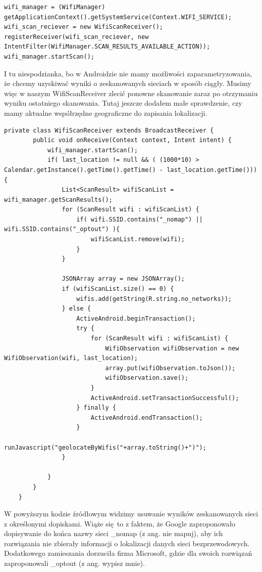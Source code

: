 \begin{verbatim}
wifi_manager = (WifiManager) getApplicationContext().getSystemService(Context.WIFI_SERVICE);
wifi_scan_reciever = new WifiScanReceiver();
registerReceiver(wifi_scan_reciever, new IntentFilter(WifiManager.SCAN_RESULTS_AVAILABLE_ACTION));
wifi_manager.startScan();
\end{verbatim}

I tu niespodzianka, bo w Androidzie nie mamy możliwości zaparametryzowania, że chcemy uzyskiwać wyniki o zeskanowanych sieciach w sposób ciągły. Musimy więc w naszym WifiScanReceiver zlecić ponowne skanowanie zaraz po otrzymaniu wyniku ostatniego skanowania. Tutaj jeszcze dodałem małe sprawdzenie, czy mamy aktualne współrzędne geograficzne do zapisania lokalizacji.

\begin{verbatim}
private class WifiScanReceiver extends BroadcastReceiver {
        public void onReceive(Context context, Intent intent) {
            wifi_manager.startScan();
            if( last_location != null && ( (1000*10) > Calendar.getInstance().getTime().getTime() - last_location.getTime())){
                List<ScanResult> wifiScanList = wifi_manager.getScanResults();
                for (ScanResult wifi : wifiScanList) {
                    if( wifi.SSID.contains("_nomap") || wifi.SSID.contains("_optout") ){
                        wifiScanList.remove(wifi);
                    }
                }

                JSONArray array = new JSONArray();
                if (wifiScanList.size() == 0) {
                    wifis.add(getString(R.string.no_networks));
                } else {
                    ActiveAndroid.beginTransaction();
                    try {
                        for (ScanResult wifi : wifiScanList) {
                            WifiObservation wifiObservation = new WifiObservation(wifi, last_location);
                            array.put(wifiObservation.toJson());
                            wifiObservation.save();
                        }
                        ActiveAndroid.setTransactionSuccessful();
                    } finally {
                        ActiveAndroid.endTransaction();
                    }
                    runJavascript("geolocateByWifis("+array.toString()+")");
                }

            }
        }
    }
\end{verbatim}
W powyższym kodzie źródłowym widzimy usuwanie wyników zeskanowanych sieci z określonymi dopiskami. Wiąże się to z faktem, że Google zaproponowało dopisywanie do końca nazwy sieci \_nomap (z ang. nie mapuj), aby ich rozwiązania nie zbierały informacji o lokalizacji danych sieci bezprzewodowych.\cite{GoogleNomap} Dodatkowego zamieszania dorzuciła firma Microsoft, gdzie dla swoich rozwiązań zaproponowali \_optout (z ang. wypisz mnie).\cite{MicrosoftOptout}

